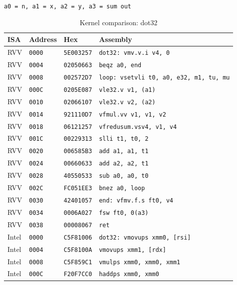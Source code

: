 \begin{table}[htbp]
\centering
\caption{Kernel comparison: dot32}
\begingroup
\scriptsize
\setlength{\tabcolsep}{4pt}
\noindent \texttt{a0 = n, a1 = x, a2 = y, a3 = sum out}\par
\vspace{0.6ex}
\begin{tabular}{@{}l|l|l|p{7.2cm}@{}}
\toprule
ISA & Address & Hex & Assembly \\
\midrule
RVV & \texttt{0000} & \texttt{5E003257} & \texttt{dot32: vmv.v.i v4, 0} \\
RVV & \texttt{0004} & \texttt{02050663} & \texttt{beqz a0, end} \\
RVV & \texttt{0008} & \texttt{002572D7} & \texttt{loop: vsetvli t0, a0, e32, m1, tu, mu} \\
RVV & \texttt{000C} & \texttt{0205E087} & \texttt{vle32.v v1, (a1)} \\
RVV & \texttt{0010} & \texttt{02066107} & \texttt{vle32.v v2, (a2)} \\
RVV & \texttt{0014} & \texttt{921110D7} & \texttt{vfmul.vv v1, v1, v2} \\
RVV & \texttt{0018} & \texttt{06121257} & \texttt{vfredusum.vsv4, v1, v4} \\
RVV & \texttt{001C} & \texttt{00229313} & \texttt{slli t1, t0, 2} \\
RVV & \texttt{0020} & \texttt{006585B3} & \texttt{add a1, a1, t1} \\
RVV & \texttt{0024} & \texttt{00660633} & \texttt{add a2, a2, t1} \\
RVV & \texttt{0028} & \texttt{40550533} & \texttt{sub a0, a0, t0} \\
RVV & \texttt{002C} & \texttt{FC051EE3} & \texttt{bnez a0, loop} \\
RVV & \texttt{0030} & \texttt{42401057} & \texttt{end: vfmv.f.s ft0, v4} \\
RVV & \texttt{0034} & \texttt{0006A027} & \texttt{fsw ft0, 0(a3)} \\
RVV & \texttt{0038} & \texttt{00008067} & \texttt{ret} \\
\midrule
Intel & \texttt{0000} & \texttt{C5F81006} & \texttt{dot32: vmovups xmm0, [rsi]} \\
Intel & \texttt{0004} & \texttt{C5F8100A} & \texttt{vmovups xmm1, [rdx]} \\
Intel & \texttt{0008} & \texttt{C5F859C1} & \texttt{vmulps xmm0, xmm0, xmm1} \\
Intel & \texttt{000C} & \texttt{F20F7CC0} & \texttt{haddps xmm0, xmm0} \\

\end{tabular}
\end{table}
